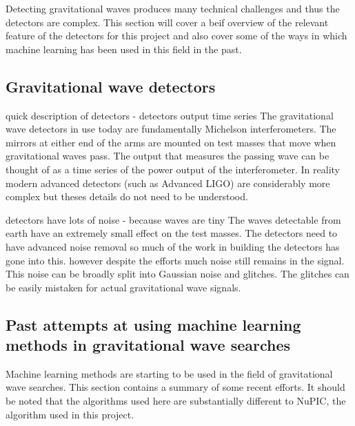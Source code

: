 \documentclass[a4paper]{jpconf}
\begin{document}
Detecting gravitational waves produces many technical challenges and thus the detectors are complex. This section will cover a beif overview of the relevant feature of the detectors for this project and also cover some of the ways in which machine learning has been used in this field in the past.

\subsection{Gravitational wave detectors}
quick description of detectors - detectors output time series
The gravitational wave detectors in use today are fundamentally Michelson interferometers. The mirrors at either end of the arms are mounted on test masses that move when gravitational waves pass. The output that measures the passing wave can be thought of as a time series of the power output of the interferometer. In reality modern advanced detectors (such as Advanced LIGO) are considerably more complex but theses details do not need to be understood.

detectors have lots of noise - because waves are tiny
The waves detectable from earth have an extremely small effect on the test masses. The detectors need to have advanced noise removal so much of the work in building the detectors has gone into this. however despite the efforts much noise still remains in the signal. This noise can be broadly split into Gaussian noise and glitches. The glitches can be easily mistaken for actual gravitational wave signals.

\subsection{Past attempts at using machine learning methods in gravitational wave searches}
Machine learning methods are starting to be used in the field of gravitational wave searches. This section contains a summary of some recent efforts. It should be noted that the algorithms used here are substantially different to NuPIC, the algorithm used in this project.
\end{document}
